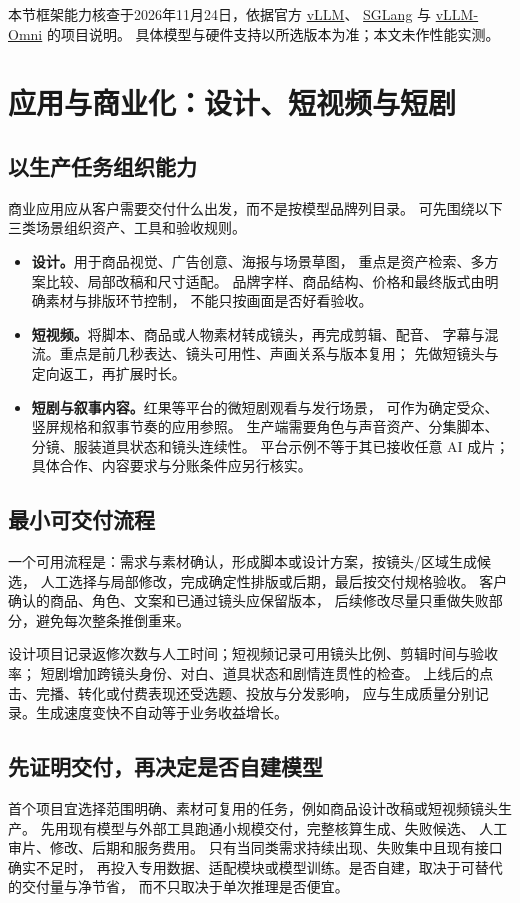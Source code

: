 \par\medskip
{\small 本节框架能力核查于2026年11月24日，依据官方
\href{https://github.com/vllm-project/vllm}{vLLM}、
\href{https://github.com/sgl-project/sglang}{SGLang} 与
\href{https://github.com/vllm-project/vllm-omni}{vLLM-Omni} 的项目说明。
具体模型与硬件支持以所选版本为准；本文未作性能实测。\par}

\chapter{应用与商业化：设计、短视频与短剧}
\label{aigc:applications}

\section{以生产任务组织能力}

商业应用应从客户需要交付什么出发，而不是按模型品牌列目录。
可先围绕以下三类场景组织资产、工具和验收规则。

\begin{itemize}
\item \textbf{设计。}用于商品视觉、广告创意、海报与场景草图，
重点是资产检索、多方案比较、局部改稿和尺寸适配。
品牌字样、商品结构、价格和最终版式由明确素材与排版环节控制，
不能只按画面是否好看验收。
\item \textbf{短视频。}将脚本、商品或人物素材转成镜头，再完成剪辑、配音、
字幕与混流。重点是前几秒表达、镜头可用性、声画关系与版本复用；
先做短镜头与定向返工，再扩展时长。
\item \textbf{短剧与叙事内容。}红果等平台的微短剧观看与发行场景，
可作为确定受众、竖屏规格和叙事节奏的应用参照。
生产端需要角色与声音资产、分集脚本、分镜、服装道具状态和镜头连续性。
平台示例不等于其已接收任意 AI 成片；具体合作、内容要求与分账条件应另行核实。
\end{itemize}

\section{最小可交付流程}

一个可用流程是：需求与素材确认，形成脚本或设计方案，按镜头/区域生成候选，
人工选择与局部修改，完成确定性排版或后期，最后按交付规格验收。
客户确认的商品、角色、文案和已通过镜头应保留版本，
后续修改尽量只重做失败部分，避免每次整条推倒重来。

设计项目记录返修次数与人工时间；短视频记录可用镜头比例、剪辑时间与验收率；
短剧增加跨镜头身份、对白、道具状态和剧情连贯性的检查。
上线后的点击、完播、转化或付费表现还受选题、投放与分发影响，
应与生成质量分别记录。生成速度变快不自动等于业务收益增长。

\section{先证明交付，再决定是否自建模型}

首个项目宜选择范围明确、素材可复用的任务，例如商品设计改稿或短视频镜头生产。
先用现有模型与外部工具跑通小规模交付，完整核算生成、失败候选、
人工审片、修改、后期和服务费用。
只有当同类需求持续出现、失败集中且现有接口确实不足时，
再投入专用数据、适配模块或模型训练。是否自建，取决于可替代的交付量与净节省，
而不只取决于单次推理是否便宜。
